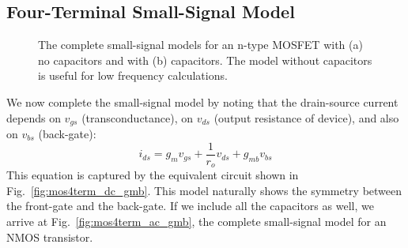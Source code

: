 \subsection{Four-Terminal Small-Signal Model}
\begin{figure}[tb]
\centering
{}
\caption{The complete small-signal models for an n-type MOSFET with (a) no capacitors and with (b) capacitors.  The model without capacitors is useful for low frequency calculations.} 
\end{figure}
We now complete the small-signal model by noting that the drain-source current depends on $v_{gs}$ (transconductance), on $v_{ds}$ (output resistance of device), and also on $v_{bs}$ (back-gate):
    \begin{equation}
        {i_{ds}} = {g_m}{v_{gs}} + \frac{1}{{{r_o}}}{v_{ds}} + {g_{mb}}{v_{bs}} 
    \end{equation}
This equation is captured by the equivalent circuit shown in Fig.~\ref{fig:mos4term_dc_gmb}.  This model naturally shows the symmetry between the front-gate and the back-gate.  If we include all the capacitors as well, we arrive at Fig.~\ref{fig:mos4term_ac_gmb}, the complete small-signal model for an NMOS transistor.
